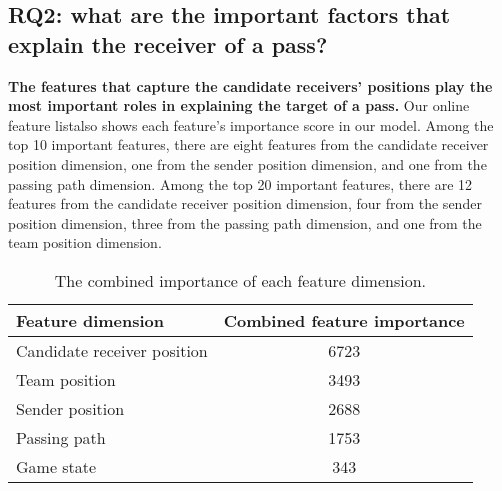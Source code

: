 \subsection{RQ2: what are the important factors that explain the receiver of a pass?}\label{RQ3-results}

\textbf{The features that capture the candidate receivers' positions play the most important roles in explaining the target of a pass.}
Our online feature list\footnotemark[\ref{feature-list}] also shows each feature's importance score in our model.
Among the top 10 important features, there are eight features from the candidate receiver position dimension, one from the sender position dimension, and one from the passing path dimension.
Among the top 20 important features, there are 12 features from the candidate receiver position dimension, four from the sender position dimension, three from the passing path dimension, and one from the team position dimension.

\begin{table}[!t]
\caption{The combined importance of each feature dimension.}
\centering
\begin{tabular}{lc}
  \toprule
  Feature dimension & Combined feature importance \\
  \midrule
  Candidate receiver position & 6723 \\
  Team position & 3493 \\
  Sender position & 2688 \\
  Passing path & 1753 \\
  Game state & 343 \\
  \bottomrule
\end{tabular}
\label{tab:combined-feature-importance}
\end{table}

